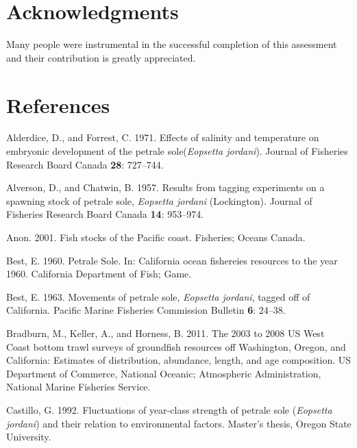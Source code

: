 \documentclass[12pt,]{article}
\begin{document}
\section{Acknowledgments}\label{acknowledgments}

Many people were instrumental in the successful completion of this
assessment and their contribution is greatly appreciated.

\newpage

\FloatBarrier

\section{References}\label{references}

\hypertarget{refs}{}
\hypertarget{ref-alderdice_effects_1971}{}
Alderdice, D., and Forrest, C. 1971. Effects of salinity and temperature
on embryonic development of the petrale sole(\emph{Eopsetta jordani}).
Journal of Fisheries Research Board Canada \textbf{28}: 727--744.

\hypertarget{ref-alverson_results_1957}{}
Alverson, D., and Chatwin, B. 1957. Results from tagging experiments on
a spawning stock of petrale sole, \emph{Eopsetta jordani} (Lockington).
Journal of Fisheries Research Board Canada \textbf{14}: 953--974.

\hypertarget{ref-anon_fish_2001}{}
Anon. 2001. Fish stocks of the Pacific coast. Fisheries; Oceans Canada.

\hypertarget{ref-best_petrale_1960}{}
Best, E. 1960. Petrale Sole. In: California ocean fishereies resources
to the year 1960. California Department of Fish; Game.

\hypertarget{ref-best_e.a._movements_1963}{}
Best, E. 1963. Movements of petrale sole, \emph{Eopsetta jordani},
tagged off of California. Pacific Marine Fisheries Commission Bulletin
\textbf{6}: 24--38.

\hypertarget{ref-bradburn_2003_2011}{}
Bradburn, M., Keller, A., and Horness, B. 2011. The 2003 to 2008 US West
Coast bottom trawl surveys of groundfish resources off Washington,
Oregon, and California: Estimates of distribution, abundance, length,
and age composition. US Department of Commerce, National Oceanic;
Atmospheric Administration, National Marine Fisheries Service.

\hypertarget{ref-castillo_g.c._fluctuations_1992}{}
Castillo, G. 1992. Fluctuations of year-class strength of petrale sole
(\emph{Eopsetta jordani}) and their relation to environmental factors.
Master's thesis, Oregon State University.
\end{document}
